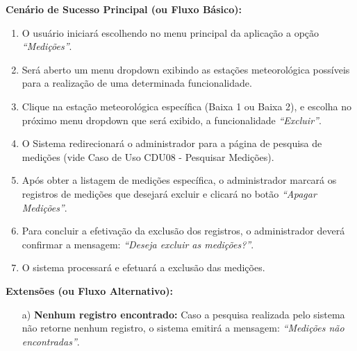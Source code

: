 \begin{mdframed}
\begin{flushleft}
		\textbf{Cenário de Sucesso Principal (ou Fluxo Básico):}
			\begin{enumerate}
				\item{O usuário iniciará escolhendo no menu principal da aplicação a opção \textit{``Medições''}.}
				\item{Será aberto um menu dropdown exibindo as estações meteorológica possíveis para a realização de uma determinada funcionalidade.}
				\item{Clique na estação meteorológica específica (Baixa 1 ou Baixa 2), e escolha no próximo menu dropdown que será exibido, a funcionalidade \textit{``Excluir''}.}
			 	\item{O Sistema redirecionará o administrador para a página de pesquisa de medições (vide Caso de Uso CDU08 - Pesquisar Medições).}
			 	\item{Após obter a listagem de medições específica, o administrador marcará os registros de medições que desejará excluir e clicará no botão \textit{``Apagar Medições''}.}
			 	\item{Para concluir a efetivação da exclusão dos registros, o administrador deverá confirmar a mensagem: \textit{``Deseja excluir as medições?''}.}
			 	\item{O sistema processará e efetuará a exclusão das medições.}
			 \end{enumerate}

		\textbf{Extensões (ou Fluxo Alternativo):}
		\begin{itemize}
			\item[a)] \textbf{Nenhum registro encontrado:} Caso a pesquisa  realizada pelo sistema não retorne nenhum registro, o sistema emitirá a mensagem: \textit{``Medições não encontradas''}.
		\end{itemize}


		\end{flushleft}

	\end{mdframed}

